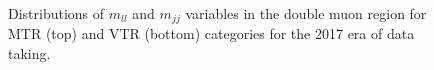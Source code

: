 \begin{figure}[htbp]
{    }
  \caption{Distributions of $m_{ll}$ and $m_{jj}$ variables in the double muon region for MTR (top) and VTR (bottom) categories for the 2017 era of data taking.}
  \label{fig:2017_Zmumu_1}
\end{figure}

